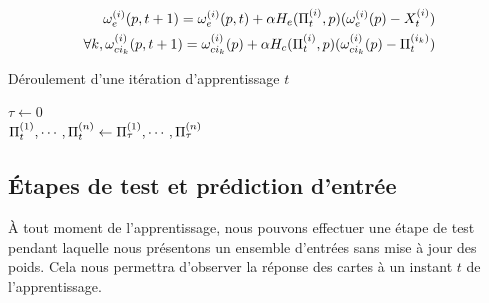\documentclass[../main]{subfiles}
\begin{document}
\begin{align}\label{eq:update_general}
 \omega_{e}^{({i})}(p,t+1) = \omega_{e}^{({i})}(p,t) + \alpha H_{e}(\Pi_t^{({i})}, p)(\omega_{e}^{({i})}(p) - X_t^{({i})}) \\
\forall k, \omega_{ci_k}^{({i})}(p,t+1) = \omega_{ci_k}^{({i})}(p) + \alpha H_{c}(\Pi_t^{({i})},p)(\omega_{ci_k}^{({i})}(p) - \Pi^{({i_k})}_t)
\end{align}


\begin{algorithm}\label{algo:cxsom}
\caption{Déroulement d'une itération d'apprentissage $t$}
\SetAlgoLined
  $\tau \leftarrow 0$\\
  $\Pi^{({1})}_t, \cdots, \Pi^{({n})}_t \leftarrow  \Pi^{({1})}_\tau, \cdots, \Pi^{({n})}_\tau$\\
 \end{algorithm}
 
\subsection{\'Etapes de test et prédiction d'entrée}\label{sec:modele_test}

\`A tout moment de l'apprentissage, nous pouvons effectuer une étape de test pendant laquelle nous présentons un ensemble d'entrées sans mise à jour des poids. Cela nous permettra d'observer la réponse des cartes à un instant $t$ de l'apprentissage.
\end{document}
